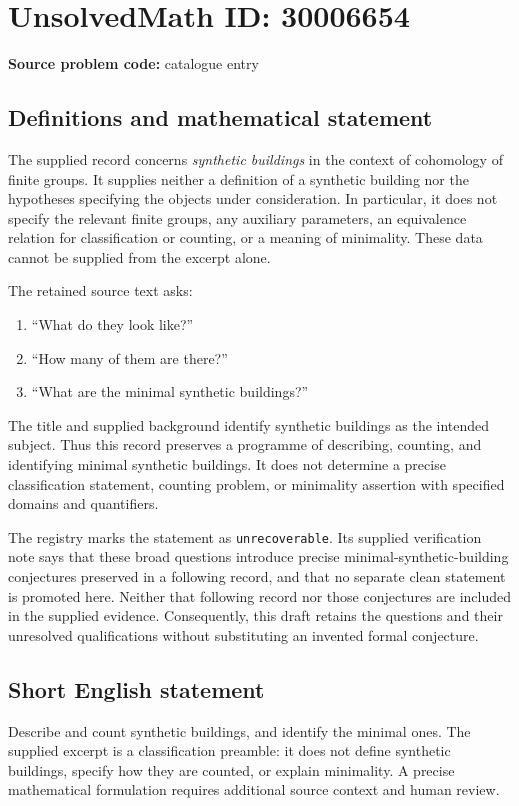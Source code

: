 \documentclass[11pt]{article}
\begin{document}
\section*{UnsolvedMath ID: 30006654}
\textbf{Source problem code:} catalogue entry
\subsection{Definitions and mathematical statement}
The supplied record concerns \emph{synthetic buildings} in the context of cohomology of finite groups. It supplies neither a definition of a synthetic building nor the hypotheses specifying the objects under consideration. In particular, it does not specify the relevant finite groups, any auxiliary parameters, an equivalence relation for classification or counting, or a meaning of minimality. These data cannot be supplied from the excerpt alone.

The retained source text asks:
\begin{enumerate}
\item ``What do they look like?''
\item ``How many of them are there?''
\item ``What are the minimal synthetic buildings?''
\end{enumerate}
The title and supplied background identify synthetic buildings as the intended subject. Thus this record preserves a programme of describing, counting, and identifying minimal synthetic buildings. It does not determine a precise classification statement, counting problem, or minimality assertion with specified domains and quantifiers.

The registry marks the statement as \texttt{unrecoverable}. Its supplied verification note says that these broad questions introduce precise minimal-synthetic-building conjectures preserved in a following record, and that no separate clean statement is promoted here. Neither that following record nor those conjectures are included in the supplied evidence. Consequently, this draft retains the questions and their unresolved qualifications without substituting an invented formal conjecture.
\subsection{Short English statement}
Describe and count synthetic buildings, and identify the minimal ones. The supplied excerpt is a classification preamble: it does not define synthetic buildings, specify how they are counted, or explain minimality. A precise mathematical formulation requires additional source context and human review.
\end{document}
